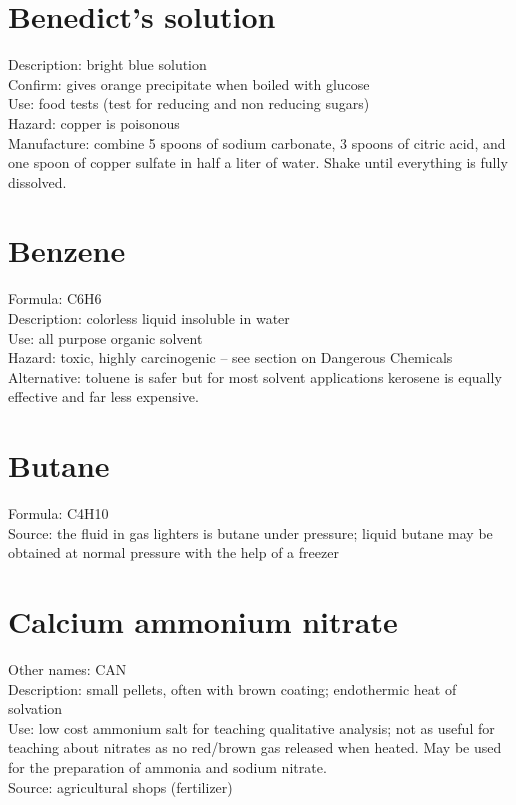 \section{Benedict's solution}
Description: bright blue solution\\
Confirm: gives orange precipitate when boiled with glucose\\
Use: food tests (test for reducing and non reducing sugars)\\
Hazard: copper is poisonous\\
Manufacture: combine 5 spoons of sodium carbonate, 
3 spoons of citric acid, 
and one spoon of copper sulfate in half a liter of water. 
Shake until everything is fully dissolved.

\section{Benzene}
Formula: C6H6\\
Description: colorless liquid insoluble in water\\
Use: all purpose organic solvent\\
Hazard: toxic, 
highly carcinogenic – see section on Dangerous Chemicals\\
Alternative: toluene is safer but for most solvent applications 
kerosene is equally effective and far less expensive.

\section{Butane}
Formula: C4H10\\
Source: the fluid in gas lighters is butane under pressure; 
liquid butane may be obtained at normal pressure with the help of a freezer

\section{Calcium ammonium nitrate}
Other names: CAN\\
Description: small pellets, 
often with brown coating; 
endothermic heat of solvation\\
Use: low cost ammonium salt for teaching qualitative analysis; 
not as useful for teaching about nitrates 
as no red/brown gas released when heated. 
May be used for the preparation of ammonia and sodium nitrate.\\
Source: agricultural shops (fertilizer)\\

